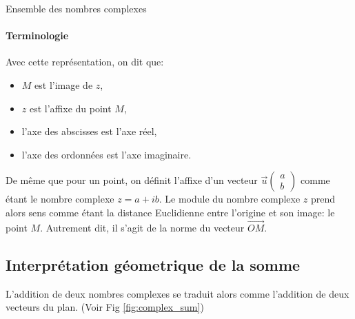 \begin{chapter}{Ensemble des nombres complexes}
\paragraph{Terminologie}
Avec cette repr\'esentation, on dit que:
\begin{itemize}
\item $M$ est l'image de $z$,
\item $z$ est l'affixe du point $M$,
\item l'axe des abscisses est l'axe r\'eel,
\item l'axe des ordonn\'ees est l'axe imaginaire.
\end{itemize}
%
De m\^eme que pour un point, on d\'efinit l'affixe d'un vecteur $\vec{u} \left( \begin{matrix} a \\ b \end{matrix} \right)$
comme \'etant le nombre complexe $z = a + i b$.
%
Le module du nombre complexe $z$ prend alors sens comme \'etant la distance Euclidienne entre l'origine et son image: le point $M$.
Autrement dit, il s'agit de la norme du vecteur $\overrightarrow{OM}$. 

\subsection{Interpr\'etation g\'eometrique de la somme} 
%
%
L'addition de deux nombres complexes se traduit alors comme l'addition de deux vecteurs du plan. (Voir Fig \ref{fig:complex_sum}) \\


\end{chapter}
